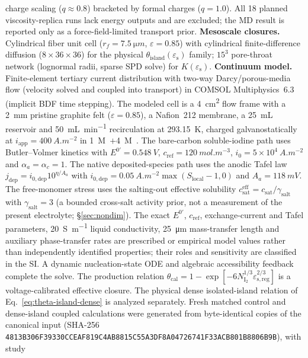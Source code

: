 \documentclass[11pt]{article}
\newcommand{\csat}{c_{\mathrm{sat}}}
\newcommand{\epss}{\varepsilon_{\mathrm{s}}}
\newcommand{\epsl}{\varepsilon}
\newcommand{\iapp}{i_{\mathrm{app}}}
\newcommand{\thetacal}{\theta_{\mathrm{cal}}}
\newcommand{\thetaisland}{\theta_{\mathrm{island}}}
\begin{document}
charge scaling ($q\!\approx\!0.8$)
\citep{Leontyev2009ECC} bracketed
by formal charges ($q\!=\!1.0$). All 18 planned viscosity-replica runs lack energy outputs and are excluded;
the MD result is reported only as a force-field-limited transport prior. \textbf{Mesoscale closures.} Cylindrical fiber unit cell ($r_f=\SI{7.5}{\micro m}$,
$\epsl=0.85$) with cylindrical finite-difference diffusion ($8\times36\times36$) for the physical
$\thetaisland(\epss)$ family;
$15^3$ pore-throat network (lognormal radii, sparse SPD solve) for $K(\epss)$.
\textbf{Continuum model.} Finite-element tertiary current distribution with two-way Darcy/porous-media
flow (velocity solved and coupled into transport) in COMSOL Multiphysics~6.3 (implicit BDF time stepping).
The modeled cell is a \SI{4}{cm^2} flow frame with a \SI{2}{mm} pristine graphite felt ($\varepsilon=0.85$),
a Nafion~212 membrane, a \SI{25}{mL} reservoir and \SI{50}{mL.min^{-1}} recirculation at \SI{293.15}{K},
charged galvanostatically at $\iapp=\SI{400}{A.m^{-2}}$ in \SI{1}{M}~$+$\SI{4}{M}~.
The bare-carbon soluble-iodine path uses Butler--Volmer kinetics with
$E^{0\prime}=\SI{0.548}{V}$, $c_{\mathrm{ref}}=\SI{120}{mol.m^{-3}}$,
$i_0=5\times10^{4}~\si{A.m^{-2}}$ and $\alpha_a=\alpha_c=1$. The native deposited-species path uses the
anodic Tafel law $j_{\mathrm{dep}}=i_{0,\mathrm{dep}}10^{\eta/A_a}$ with
$i_{0,\mathrm{dep}}=\SI{0.05}{A.m^{-2}}\max(S_{\mathrm{local}}-1,0)$ and $A_a=\SI{118}{mV}$.
The free-monomer stress uses the
salting-out effective solubility $\csat^{\mathrm{eff}}=\csat/\gamma_{\mathrm{salt}}$ with
$\gamma_{\mathrm{salt}}=3$ (a bounded cross-salt activity prior, not a measurement of the present electrolyte;
\S\ref{sec:nondim}). The exact $E^{0\prime}$, $c_{\mathrm{ref}}$, exchange-current and Tafel parameters,
\SI{20}{S.m^{-1}} liquid conductivity, \SI{25}{\micro m} mass-transfer length and auxiliary phase-transfer
rates are prescribed or empirical model values rather than independently identified properties; their roles and
sensitivity are classified in the SI. A dynamic nucleation-state ODE and algebraic accessibility feedback
complete the solve. The production relation
$\thetacal=1-\exp[-6N_{\mathrm{I_2}}^{1/3}\varepsilon_{\mathrm{s,reg}}^{2/3}]$ is a voltage-calibrated
effective closure. The physical dense isolated-island relation of Eq.~\eqref{eq:theta-island-dense} is analyzed
separately. Fresh matched control and dense-island coupled calculations were generated from byte-identical
copies of the canonical input (SHA-256
\texttt{4813B306F39330CCEAF819C4AB8815C55A3DF8A04726741F33ACB801B8806B9B}), with study
\end{document}
